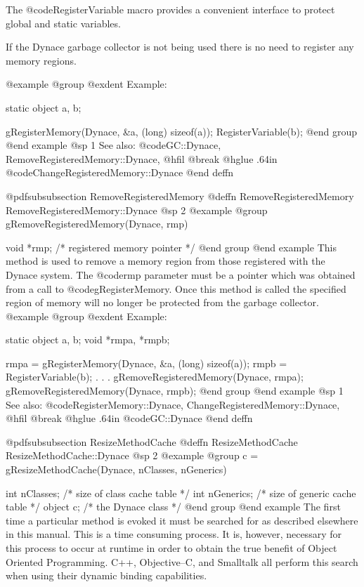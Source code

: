 The @code{RegisterVariable} macro provides a convenient interface
to protect global and static variables.

If the Dynace garbage collector is not being used there is no need to
register any memory regions.

@example
@group
@exdent Example:

static  object  a, b;

gRegisterMemory(Dynace, &a, (long) sizeof(a));
RegisterVariable(b);
@end group
@end example
@sp 1
See also:  @code{GC::Dynace, RemoveRegisteredMemory::Dynace,}
@hfil @break @hglue .64in   @code{ChangeRegisteredMemory::Dynace}
@end deffn





@pdfsubsubsection {RemoveRegisteredMemory}
@deffn {RemoveRegisteredMemory} RemoveRegisteredMemory::Dynace
@sp 2
@example
@group
gRemoveRegisteredMemory(Dynace, rmp)

void    *rmp;   /*  registered memory pointer  */
@end group
@end example
This method is used to remove a memory region from those registered
with the Dynace system.  The @code{rmp} parameter must be a pointer
which was obtained from a call to @code{gRegisterMemory}.  Once
this method is called the specified region of memory will no longer
be protected from the garbage collector.
@example
@group
@exdent Example:

static  object  a, b;
void    *rmpa, *rmpb;

rmpa = gRegisterMemory(Dynace, &a, (long) sizeof(a));
rmpb = RegisterVariable(b);
   .
   .
   .
gRemoveRegisteredMemory(Dynace, rmpa);
gRemoveRegisteredMemory(Dynace, rmpb);
@end group
@end example
@sp 1
See also:  @code{RegisterMemory::Dynace, ChangeRegisteredMemory::Dynace,}
@hfil @break @hglue .64in   @code{GC::Dynace}
@end deffn








@pdfsubsubsection {ResizeMethodCache}
@deffn {ResizeMethodCache} ResizeMethodCache::Dynace
@sp 2
@example
@group
c = gResizeMethodCache(Dynace, nClasses, nGenerics)

int     nClasses;       /*  size of class cache table */
int     nGenerics;      /*  size of generic cache table */
object  c;              /*  the Dynace class  */
@end group
@end example
The first time a particular method is evoked it must be searched for
as described elsewhere in this manual.  This is a time consuming
process.  It is, however, necessary for this process to occur at runtime
in order to obtain the true benefit of Object Oriented Programming.
C++, Objective--C, and Smalltalk all perform this search when using their
dynamic binding capabilities.

